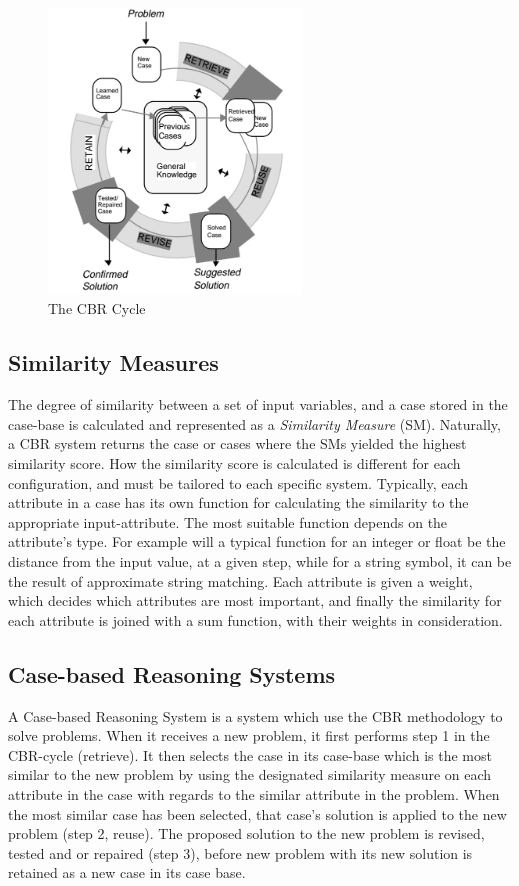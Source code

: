 \begin{figure}[H]
    \centering
    \includegraphics[width=0.6\textwidth]{fig/cbr_cycle.png}
    \caption{The CBR Cycle}
    \label{fig:cbr_cycle}
\end{figure}

\subsection{Similarity Measures}
The degree of similarity between a set of input variables, and a case stored in the case-base is calculated and represented as a \emph{Similarity Measure} (SM). Naturally, a CBR system returns the case or cases where the SMs yielded the highest similarity score. How the similarity score is calculated is different for each configuration, and must be tailored to each specific system. Typically, each attribute in a case has its own function for calculating the similarity to the appropriate input-attribute. The most suitable function depends on the attribute's type. For example will a typical function for an integer or float be the distance from the input value, at a given step, while for a string symbol, it can be the result of approximate string matching. Each attribute is given a weight, which decides which attributes are most important, and finally the similarity for each attribute is joined with a sum function, with their weights in consideration.

\subsection{Case-based Reasoning Systems}
A Case-based Reasoning System is a system which use the CBR methodology to solve problems. When it receives a new problem, it first performs step 1 in the CBR-cycle (retrieve). It then selects the case in its case-base which is the most similar to the new problem by using the designated similarity measure on each attribute in the case with regards to the similar attribute in the problem. When the most similar case has been selected, that case's solution is applied to the new problem (step 2, reuse). The proposed solution to the new problem is revised, tested and or repaired (step 3), before new problem with its new solution is retained as a new case in its case base.

